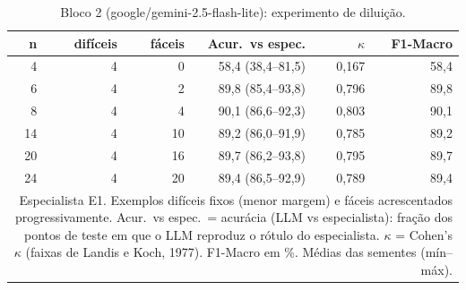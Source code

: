 \begin{table}[htbp]
\centering
\small
\caption{Bloco 2 (google/gemini-2.5-flash-lite): experimento de diluição.}
\label{tab:bloco2_E1_diluicao_flashlite}
\begin{tabular}{rrrrrr}
\toprule
n & difíceis & fáceis & Acur.\ vs espec. & $\kappa$ & F1-Macro \\
\midrule
4 & 4 & 0 & 58,4 (38,4–81,5) & 0,167 & 58,4 \\
6 & 4 & 2 & 89,8 (85,4–93,8) & 0,796 & 89,8 \\
8 & 4 & 4 & 90,1 (86,6–92,3) & 0,803 & 90,1 \\
14 & 4 & 10 & 89,2 (86,0–91,9) & 0,785 & 89,2 \\
20 & 4 & 16 & 89,7 (86,2–93,8) & 0,795 & 89,7 \\
24 & 4 & 20 & 89,4 (86,5–92,9) & 0,789 & 89,4 \\
\bottomrule
\multicolumn{6}{p{0.95\linewidth}}{\footnotesize Especialista E1. Exemplos difíceis fixos (menor margem) e fáceis acrescentados progressivamente. Acur.\ vs espec.\ = acurácia (LLM vs especialista): fração dos pontos de teste em que o LLM reproduz o rótulo do especialista. $\kappa$ = Cohen's $\kappa$ (faixas de Landis e Koch, 1977). F1-Macro em \%. Médias das sementes (mín–máx).} \\
\end{tabular}
\end{table}
